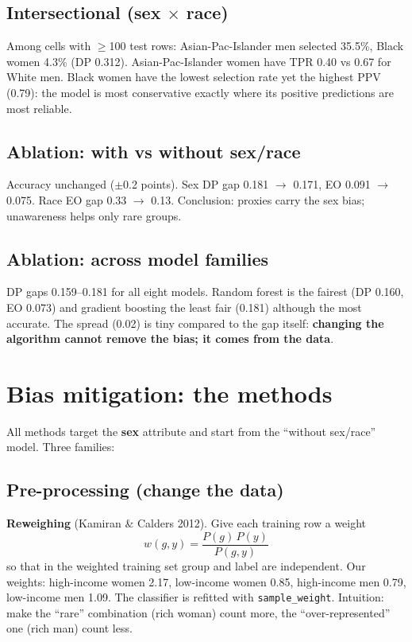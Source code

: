 \documentclass[11pt,a4paper]{article}
\begin{document}
\subsection{Intersectional (sex $\times$ race)} Among cells with $\geq$100 test rows: Asian-Pac-Islander men selected 35.5\%, Black women 4.3\% (DP 0.312). Asian-Pac-Islander women have TPR 0.40 vs 0.67 for White men. Black women have the lowest selection rate yet the highest PPV (0.79): the model is most conservative exactly where its positive predictions are most reliable.

\subsection{Ablation: with vs without sex/race} Accuracy unchanged ($\pm$0.2 points). Sex DP gap 0.181 $\to$ 0.171, EO 0.091 $\to$ 0.075. Race EO gap 0.33 $\to$ 0.13. Conclusion: proxies carry the sex bias; unawareness helps only rare groups.

\subsection{Ablation: across model families} DP gaps 0.159--0.181 for all eight models. Random forest is the fairest (DP 0.160, EO 0.073) and gradient boosting the least fair (0.181) although the most accurate. The spread (0.02) is tiny compared to the gap itself: \textbf{changing the algorithm cannot remove the bias; it comes from the data}.

\section{Bias mitigation: the methods}\label{sec:mitigation}

All methods target the \textbf{sex} attribute and start from the ``without sex/race'' model. Three families:

\subsection{Pre-processing (change the data)}
\textbf{Reweighing} (Kamiran \& Calders 2012). Give each training row a weight
\[ w(g,y)=\frac{P(g)\,P(y)}{P(g,y)} \]
so that in the weighted training set group and label are independent. Our weights: high-income women 2.17, low-income women 0.85, high-income men 0.79, low-income men 1.09. The classifier is refitted with \texttt{sample\_weight}. Intuition: make the ``rare'' combination (rich woman) count more, the ``over-represented'' one (rich man) count less.
\end{document}
